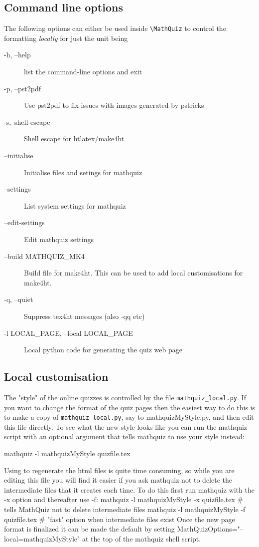 \documentclass[svgnames]{article}
\begin{document}
\subsection{Command line options}

    The following options can either be used inside \Verb|\MathQuiz| to
    control the formatting \textit{locally} for just the unit being


    \begin{description}
       \item[ -h, --help]            list the command-line options and exit
       \item[-p, --pst2pdf]
          Use pst2pdf to fix issues with images generated by pstricks
       \item[-s,--shell-escape]
          Shell escape for htlatex/make4ht
       \item[--initialise]
          Initialise files and setings for mathquiz
       \item[--settings]
          List system settings for mathquiz
       \item[--edit-settings]
          Edit mathquiz settings
       \item[--build MATHQUIZ\_MK4]
          Build file for make4ht. This can be used to add local
          customisations for make4ht.

       \item[-q, --quiet]
          Suppress tex4ht messages (also -qq etc)
       \item[-l LOCAL\_PAGE, --local LOCAL\_PAGE]
          Local python code for generating the quiz web page
    \end{description}

    \subsection{Local customisation}\label{SS:customisation}

  The "style" of the online quizzes is controlled by the file
  \verb!mathquiz_local.py!. If you want to change the format of the quiz
  pages then the easiest way to do this is to make a copy of
  \verb!mathquiz_local.py!, say to mathquizMyStyle.py, and then edit this file
  directly. To see what the new style looks like you can run the
  mathquiz script with an optional argument that tells mathquiz to use
  your style instead:
  \begin{center}
        mathquiz -l mathquizMyStyle quizfile.tex
  \end{center}
  Using \MathQuiz to regenerate the html files is quite time consuming, so
  while you are editing this file you will find it easier if you ask
  mathquiz not to delete the intermediate files that it creates each
  time. To do this first run mathquiz with the -x option and thereafter
  use -f: mathquiz -l mathquizMyStyle -x quizfile.tex   \# tells
  MathQuiz not to delete intermediate files mathquiz -l mathquizMyStyle
  -f quizfile.tex   \# "fast" option when intermediate files exist Once
  the new page format is finalized it can be made the default by setting
  MathQuizOptions="--local=mathquizMyStyle" at the top of the mathquiz
  shell script.
\end{document}
